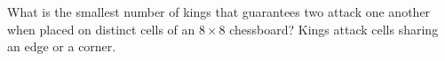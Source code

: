 What is the smallest number of kings that guarantees two attack one another when placed on distinct cells of an $8\times8$ chessboard? Kings attack cells sharing an edge or a corner.
